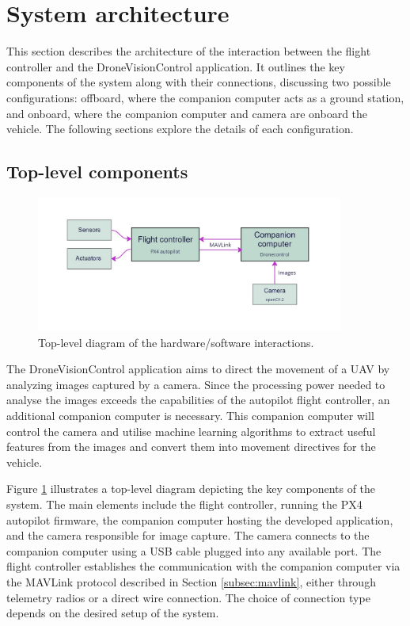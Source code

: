 \section{System architecture}
\label{sec:sysarch}

This section describes the architecture of the interaction between the flight controller and the DroneVisionControl application. It outlines the key components of the system along with their connections, discussing two possible configurations: offboard, where the companion computer acts as a ground station, and onboard, where the companion computer and camera are onboard the vehicle. The following sections explore the details of each configuration.

\subsection{Top-level components}

\begin{figure}
  \centering
  \includegraphics[width=0.9\textwidth,keepaspectratio]{img/sys-arch-diagram.jpg}
  \caption{Top-level diagram of the hardware/software interactions.}
  \label{fig:toplevel}
\end{figure}


The DroneVisionControl application aims to direct the movement of a UAV by analyzing images captured by a camera. Since the processing power needed to analyse the images exceeds the capabilities of the autopilot flight controller, an additional companion computer is necessary. This companion computer will control the camera and utilise machine learning algorithms to extract useful features from the images and convert them into movement directives for the vehicle.

Figure \ref{fig:toplevel} illustrates a top-level diagram depicting the key components of the system. The main elements include the flight controller, running the PX4 autopilot firmware, the companion computer hosting the developed application, and the camera responsible for image capture.  The camera connects to the companion computer using a USB cable plugged into any available port. The flight controller establishes the communication with the companion computer via the MAVLink protocol described in Section \ref{subsec:mavlink}, either through telemetry radios or a direct wire connection. The choice of connection type depends on the desired setup of the system.

